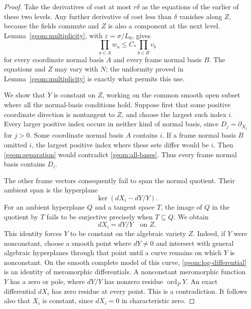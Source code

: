\documentclass[11pt]{article}
\theoremstyle{definition}
\theoremstyle{remark}
\numberwithin{equation}{section}
\begin{document}
\begin{proof}
Take the derivatives of cost at most $r\delta$ as the equations of the
earlier of these two levels. Any further derivative of cost less than
$\delta$ vanishes along $Z$, because the fields commute and $Z$ is
also a component at the next level. Lemma~\ref{geom:multiplicity}, with
$\varepsilon=\sigma/L_0$, gives
\begin{equation}
\label{geom:all-bases}
 \prod_{a\in A}w_a\le C_*\prod_{b\in B}v_b
\end{equation}
for every coordinate normal basis $A$ and every frame normal basis $B$.
The equations and $Z$ may vary with $N$; the uniformity proved in
Lemma~\ref{geom:multiplicity} is exactly what permits this use.

We show that $Y$ is constant on $Z$, working on the common smooth open
subset where all the normal-basis conditions hold. Suppose first that
some positive coordinate direction is nontangent to $Z$, and choose the
largest such index $i$. Every larger positive index occurs in neither
kind of normal basis, since $D_j=\partial_{X_j}$ for $j>0$.
Some coordinate normal basis $A$ contains $i$. If a frame normal basis
$B$ omitted $i$, the largest positive index where these sets differ
would be $i$. Then
\eqref{geom:separation} would contradict \eqref{geom:all-bases}.
Thus every frame normal basis contains $D_i$.

The other frame vectors consequently fail to span the normal quotient.
Their ambient span is the hyperplane
\[
 \ker(dX_i-dY/Y).
\]
For an ambient hyperplane $Q$ and a tangent space $T$, the image of
$Q$ in the quotient by $T$ fails to be surjective precisely when
$T\subseteq Q$. We obtain
\begin{equation}
\label{geom:log-differential}
 dX_i=dY/Y\quad\text{on }Z.
\end{equation}
This identity forces $Y$ to be constant on the algebraic variety $Z$.
Indeed, if $Y$ were nonconstant, choose a smooth point where $dY\ne0$
and intersect with general algebraic hyperplanes through that point
until a curve remains on which $Y$ is nonconstant. On the smooth
complete model of this curve, \eqref{geom:log-differential} is an
identity of meromorphic differentials. A nonconstant meromorphic
function $Y$ has a zero or pole, where $dY/Y$ has nonzero residue
$\operatorname{ord}_P Y$. An exact differential $dX_i$ has zero
residue at every point. This is a contradiction. It follows also
that $X_i$ is constant, since $dX_i=0$ in characteristic zero.


\end{proof}
\end{document}

